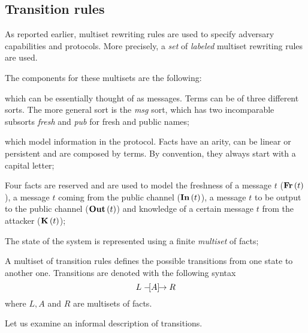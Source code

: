\subsection{Transition rules}
\label{sub:Transition-rules}
As reported earlier, multiset rewriting rules are used to specify adversary capabilities and protocols. More precisely, a \textit{set} of \textit{labeled} multiset rewriting rules are used.

The components for these multisets are the following:

\begin{description}[style=nextline]
    \item[Terms] which can be essentially thought of as messages. Terms can be of three different sorts. The more general sort is the \textit{msg} sort, which has two incomparable subsorts \textit{fresh} and \textit{pub} for fresh and public names;
    \item[Facts] which model information in the protocol. Facts have an arity, can be linear or persistent and are composed by terms. By convention, they always start with a capital letter;
    \item[Special facts] Four facts are reserved and are used to model the freshness of a message $t$ ($\mbox{\textbf{Fr}}\left(t\right)$), a message $t$ coming from the public channel ($\mbox{\textbf{In}}\left(t\right)$), a message $t$ to be output to the public channel ($\mbox{\textbf{Out}}\left(t\right)$) and knowledge of a certain message $t$ from the attacker ($\mbox{\textbf{K}}\left(t\right)$);
    \item[State of the system] The state of the system is represented using a finite \textit{multiset} of facts;
    \item[Transition rules] A multiset of transition rules defines the possible transitions from one state to another one. Transitions are denoted with the following syntax
    \begin{equation}
        L \mathrel{-\hspace{-2pt}[A]\hspace{-4pt}\to} R
    \end{equation}
    where $L, A$ and $R$ are multisets of facts.
\end{description}

Let us examine an informal description of transitions.

